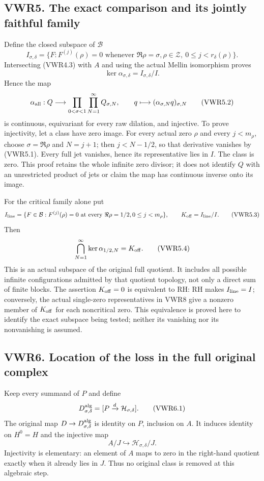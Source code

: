 \subsection{VWR5. The exact comparison and its jointly faithful
family}\label{vwr5.-the-exact-comparison-and-its-jointly-faithful-family}

Define the closed subspace of \(\mathcal B\) \[
I_{\sigma,\delta}=\{F:F^{(j)}(\rho)=0\text{ whenever }\Re\rho=\sigma,
 \rho\in\mathscr Z,\ 0\le j<r_\delta(\rho)\}.
\] Intersecting (VWR4.3) with \(A\) and using the actual Mellin
isomorphism proves \[
\ker\alpha_{\sigma,\delta}=I_{\sigma,\delta}/I.
\tag{VWR5.1}
\] Hence the map \[
\alpha_{\rm all}:Q\longrightarrow
\prod_{0<\sigma<1}\prod_{N=1}^{\infty}Q_{\sigma,N},
\qquad q\longmapsto(\alpha_{\sigma,N}q)_{\sigma,N}
\tag{VWR5.2}
\] is continuous, equivariant for every raw dilation, and injective. To
prove injectivity, let a class have zero image. For every actual zero
\(\rho\) and every \(j<m_\rho\), choose \(\sigma=\Re\rho\) and
\(N=j+1\); then \(j<N-1/2\), so that derivative vanishes by (VWR5.1).
Every full jet vanishes, hence its representative lies in \(I\). The
class is zero. This proof retains the whole infinite zero divisor; it
does not identify \(Q\) with an unrestricted product of jets or claim
the map has continuous inverse onto its image.

For the critical family alone put \[
I_{\rm line}=\{F\in\mathcal B:F^{(j)}(\rho)=0\text{ at every }\Re\rho=1/2,
 0\le j<m_\rho\},\qquad K_{\rm off}=I_{\rm line}/I.
\tag{VWR5.3}
\] Then \[
\bigcap_{N=1}^{\infty}\ker\alpha_{1/2,N}=K_{\rm off}.
\tag{VWR5.4}
\] This is an actual subspace of the original full quotient. It includes
all possible infinite configurations admitted by that quotient topology,
not only a direct sum of finite blocks. The assertion \(K_{\rm off}=0\)
is equivalent to RH: RH makes \(I_{\rm line}=I\); conversely, the actual
single-zero representatives in VWR8 give a nonzero member of
\(K_{\rm off}\) for each noncritical zero. This equivalence is proved
here to identify the exact subspace being tested; neither its vanishing
nor its nonvanishing is assumed.

\subsection{VWR6. Location of the loss in the full original
complex}\label{vwr6.-location-of-the-loss-in-the-full-original-complex}

Keep every summand of \(P\) and define \[
D_{\sigma,\delta}^{\rm alg}=[P\xrightarrow d\mathcal H_{\sigma,\delta}].
\tag{VWR6.1}
\] The original map \(D\to D_{\sigma,\delta}^{\rm alg}\) is identity on
\(P\), inclusion on \(A\). It induces identity on \(H^0=H\) and the
injective map \[
A/J\hookrightarrow\mathcal H_{\sigma,\delta}/J.
\tag{VWR6.2}
\] Injectivity is elementary: an element of \(A\) maps to zero in the
right-hand quotient exactly when it already lies in \(J\). Thus no
original class is removed at this algebraic step.

